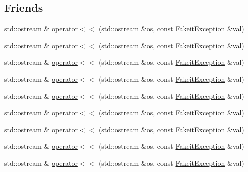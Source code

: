 \subsection*{Friends}
\begin{DoxyCompactItemize}
\item 
std\+::ostream \& \mbox{\hyperlink{structfakeit_1_1FakeitException_a8321660a372d94f410baf5fee0302fd7}{operator$<$$<$}} (std\+::ostream \&os, const \mbox{\hyperlink{structfakeit_1_1FakeitException}{Fakeit\+Exception}} \&val)
\item 
std\+::ostream \& \mbox{\hyperlink{structfakeit_1_1FakeitException_a8321660a372d94f410baf5fee0302fd7}{operator$<$$<$}} (std\+::ostream \&os, const \mbox{\hyperlink{structfakeit_1_1FakeitException}{Fakeit\+Exception}} \&val)
\item 
std\+::ostream \& \mbox{\hyperlink{structfakeit_1_1FakeitException_a8321660a372d94f410baf5fee0302fd7}{operator$<$$<$}} (std\+::ostream \&os, const \mbox{\hyperlink{structfakeit_1_1FakeitException}{Fakeit\+Exception}} \&val)
\item 
std\+::ostream \& \mbox{\hyperlink{structfakeit_1_1FakeitException_a8321660a372d94f410baf5fee0302fd7}{operator$<$$<$}} (std\+::ostream \&os, const \mbox{\hyperlink{structfakeit_1_1FakeitException}{Fakeit\+Exception}} \&val)
\item 
std\+::ostream \& \mbox{\hyperlink{structfakeit_1_1FakeitException_a8321660a372d94f410baf5fee0302fd7}{operator$<$$<$}} (std\+::ostream \&os, const \mbox{\hyperlink{structfakeit_1_1FakeitException}{Fakeit\+Exception}} \&val)
\item 
std\+::ostream \& \mbox{\hyperlink{structfakeit_1_1FakeitException_a8321660a372d94f410baf5fee0302fd7}{operator$<$$<$}} (std\+::ostream \&os, const \mbox{\hyperlink{structfakeit_1_1FakeitException}{Fakeit\+Exception}} \&val)
\item 
std\+::ostream \& \mbox{\hyperlink{structfakeit_1_1FakeitException_a8321660a372d94f410baf5fee0302fd7}{operator$<$$<$}} (std\+::ostream \&os, const \mbox{\hyperlink{structfakeit_1_1FakeitException}{Fakeit\+Exception}} \&val)
\item 
std\+::ostream \& \mbox{\hyperlink{structfakeit_1_1FakeitException_a8321660a372d94f410baf5fee0302fd7}{operator$<$$<$}} (std\+::ostream \&os, const \mbox{\hyperlink{structfakeit_1_1FakeitException}{Fakeit\+Exception}} \&val)
\item 
std\+::ostream \& \mbox{\hyperlink{structfakeit_1_1FakeitException_a8321660a372d94f410baf5fee0302fd7}{operator$<$$<$}} (std\+::ostream \&os, const \mbox{\hyperlink{structfakeit_1_1FakeitException}{Fakeit\+Exception}} \&val)
\end{DoxyCompactItemize}


